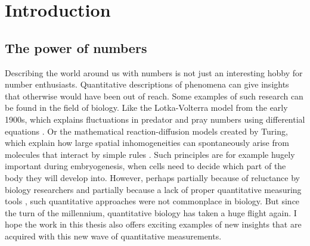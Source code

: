 \chapter{Introduction}
\label{chapter:introduction}








\section{The power of numbers}

%
Describing the world around us with numbers is not just an interesting hobby for number enthusiasts.
%
Quantitative descriptions of phenomena can give insights that otherwise would have been out of reach.
%
%
%
Some examples of such research can be found in the field of biology. 
%
Like the Lotka-Volterra model from the early 1900s, which explains fluctuations in predator and pray numbers using differential equations \cite{Lotka1920,Volterra1928}.
Or the mathematical reaction-diffusion models created by Turing, which explain how large spatial inhomogeneities can spontaneously arise from molecules 
that interact by simple rules \cite{Turing1952}.
Such principles are for example hugely important during embryogenesis, when cells need to decide which part of the body they will develop into.
%
However, perhaps partially because of reluctance by biology researchers \cite{Lazebnik2003} and partially because a lack of proper quantitative measuring tools \cite{Kitano2002, Wollman2018}, such quantitative approaches %
were not commonplace in biology.
%
But since the turn of the millennium, 
quantitative biology has taken a huge flight again.
%
I hope the work in this thesis also offers exciting examples of new insights that are acquired with this new wave of quantitative measurements.

